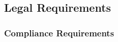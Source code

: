 \documentclass{article}
\begin{document}

\subsection{Legal Requirements}
\subsubsection{Compliance Requirements}
\end{document}
